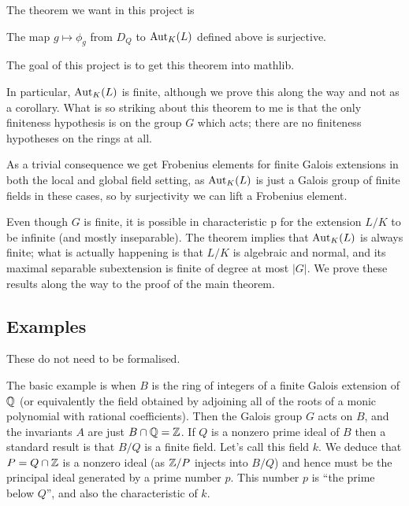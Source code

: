 The theorem we want in this project is
\begin{theorem}
  \label{MulAction.stabilizer_surjective_of_action}
  The map $g\mapsto \phi_g$ from $D_Q$ to $\operatorname{Aut}_K(L)$ defined above is surjective.
\end{theorem}

The goal of this project is to get this theorem into mathlib.

In particular, $\operatorname{Aut}_K(L)$ is finite, although we prove this along the way and not
as a corollary. What is so striking about this theorem to me is that the only finiteness hypothesis
is on the group $G$ which acts; there are no finiteness hypotheses on the rings at all.

As a trivial consequence we get Frobenius elements for finite Galois extensions in both
the local and global field setting, as $\operatorname{Aut}_K(L)$ is just a Galois group of finite fields
in these cases, so by surjectivity we can lift a Frobenius element.

Even though $G$ is finite, it is possible in characteristic p for the extension $L/K$ to be
infinite (and mostly inseparable). The theorem implies that $\operatorname{Aut}_K(L)$ is always finite;
what is actually happening is that $L/K$ is algebraic and normal, and its maximal separable
subextension is finite of degree at most $|G|$. We prove these results along the way to the
proof of the main theorem.

\subsection{Examples}

These do not need to be formalised.

The basic example is when $B$ is the ring of integers of a finite Galois extension of $\mathbb{Q}$
(or equivalently the field obtained by adjoining all of the roots of
a monic polynomial with rational coefficients).
Then the Galois group $G$ acts on $B$, and the invariants $A$ are just $B\cap\mathbb{Q}=\mathbb{Z}$. If $Q$
is a nonzero prime ideal of $B$ then a standard result is that $B/Q$ is a finite field. Let's
call this field $k$. We deduce that $P=Q\cap \mathbb{Z}$ is a nonzero ideal (as $\mathbb{Z}/P$ injects into $B/Q$)
and hence must be
the principal ideal generated by a prime number $p$. This number $p$ is ``the prime below $Q$'',
and also the characteristic of $k$.

